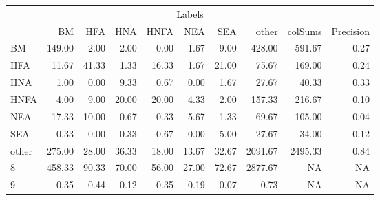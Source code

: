 \begin{table}
\centering\begingroup\fontsize{11}{13}\selectfont

\begin{tabular}{lrrrrrr>{}r|rr}
\toprule
\multicolumn{10}{c}{Labels} \\
\cmidrule(l{3pt}r{3pt}){1-10}
  & BM & HFA & HNA & HNFA & NEA & SEA & other & colSums & Precision\\
\midrule
BM & 149.00 & 2.00 & 2.00 & 0.00 & 1.67 & 9.00 & 428.00 & 591.67 & 0.27\\
HFA & 11.67 & 41.33 & 1.33 & 16.33 & 1.67 & 21.00 & 75.67 & 169.00 & 0.24\\
HNA & 1.00 & 0.00 & 9.33 & 0.67 & 0.00 & 1.67 & 27.67 & 40.33 & 0.33\\
HNFA & 4.00 & 9.00 & 20.00 & 20.00 & 4.33 & 2.00 & 157.33 & 216.67 & 0.10\\
NEA & 17.33 & 10.00 & 0.67 & 0.33 & 5.67 & 1.33 & 69.67 & 105.00 & 0.04\\
\addlinespace
SEA & 0.33 & 0.00 & 0.33 & 0.67 & 0.00 & 5.00 & 27.67 & 34.00 & 0.12\\
other & 275.00 & 28.00 & 36.33 & 18.00 & 13.67 & 32.67 & 2091.67 & 2495.33 & 0.84\\
8 & 458.33 & 90.33 & 70.00 & 56.00 & 27.00 & 72.67 & 2877.67 & NA & NA\\
9 & 0.35 & 0.44 & 0.12 & 0.35 & 0.19 & 0.07 & 0.73 & NA & NA\\
\bottomrule
\end{tabular}
\endgroup{}
\end{table}
